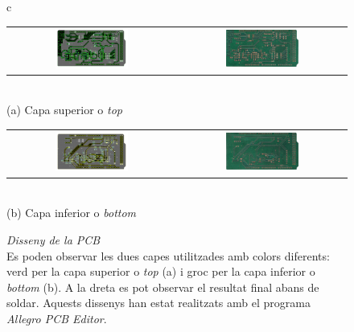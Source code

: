 \begin{figure}[ht]
\begin{tabular}{c}
	\begin{tabular}{cc}
		\includegraphics[width=0.45\textwidth]{Figures/pcb_top_white.png} & \includegraphics[width=0.45\textwidth]{Figures/pcb_top.png} \\ 
	\end{tabular}  \\ 
	(a) Capa superior o \textit{top} \\ 
	\begin{tabular}{cc}
		\includegraphics[width=0.45\textwidth]{Figures/pcb_bottom_white.png} & \includegraphics[width=0.45\textwidth]{Figures/pcb_bottom.png} \\ 
	\end{tabular}  \\ 
	(b) Capa inferior o \textit{bottom} \\ 
\end{tabular} 
\caption[Disseny de la \acs{PCB}]{\textit{Disseny de la \acs{PCB}}\\{\footnotesize Es poden observar les dues capes utilitzades amb colors diferents: verd per la capa superior o \textit{top} (a) i groc per la capa inferior o \textit{bottom} (b). A la dreta es pot observar el resultat final abans de soldar. Aquests dissenys han estat realitzats amb el programa \textit{Allegro \ac{PCB} Editor}.}}
\label{fig:pcb}
\end{figure}

